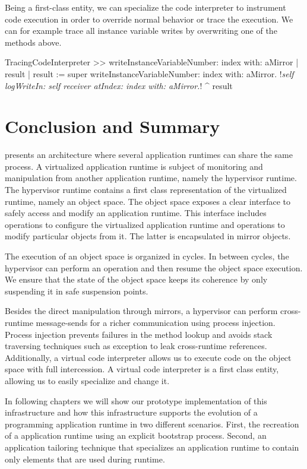 Being a first-class entity, we can specialize the code interpreter to instrument code execution in order to override normal behavior or trace the execution. We can for example trace all instance variable writes by overwriting one of the methods above.

\begin{code}
TracingCodeInterpreter >> writeInstanceVariableNumber: index with: aMirror
    | result |
    result := super writeInstanceVariableNumber: index with: aMirror.
    !\emph{self logWriteIn: self receiver atIndex: index with: aMirror.}!
    ^ result
\end{code}

\section{Conclusion and Summary}

\Vtt presents an architecture where several application runtimes can share the same process. A virtualized application runtime is subject of monitoring and manipulation from another application runtime, namely the hypervisor runtime. The hypervisor runtime contains a first class representation of the virtualized runtime, namely an object space. The object space exposes a clear interface to safely access and modify an application runtime. This interface includes operations to configure the virtualized application runtime and operations to modify particular objects from it. The latter is encapsulated in mirror objects.

The execution of an object space is organized in cycles. In between cycles, the hypervisor can perform an operation and then resume the object space execution. We ensure that the state of the object space keeps its coherence by only suspending it in safe suspension points.

Besides the direct manipulation through mirrors, a hypervisor can perform cross-runtime message-sends for a richer communication using process injection. Process injection prevents failures in the method lookup and avoids stack traversing techniques such as exception to leak cross-runtime references. Additionally, a virtual code interpreter allows us to execute code on the object space with full intercession. A virtual code interpreter is a first class entity, allowing us to easily specialize and change it.

In following chapters we will show our prototype implementation of this infrastructure and how this infrastructure supports the evolution of a programming application runtime in two different scenarios. First, the recreation of a application runtime using an explicit bootstrap process. Second, an application tailoring technique that specializes an application runtime to contain only elements that are used during runtime.

